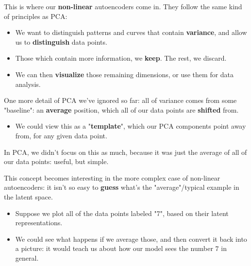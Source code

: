         This is where our \textbf{non-linear} autoencoders come in. They follow the same kind of principles as PCA: 
        
        \begin{itemize}
            \item We want to distinguish patterns and curves that contain \textbf{variance}, and allow us to \textbf{distinguish} data points.
            \item Those which contain more information, we \textbf{keep}. The rest, we discard.
            \item We can then \textbf{visualize} those remaining dimensions, or use them for data analysis.
        \end{itemize}

        \subsecdiv

        One more detail of PCA we've ignored so far: all of variance comes from some "baseline": an \textbf{average} position, which all of our data points are \textbf{shifted} from.

        \begin{itemize}
            \item We could view this as a "\textbf{template}", which our PCA components point away from, for any given data point.
        \end{itemize}

        In PCA, we didn't focus on this as much, because it was just the average of all of our data points: useful, but simple.

        This concept becomes interesting in the more complex case of non-linear autoencoders: it isn't so easy to \textbf{guess} what's the "average"/typical example in the latent space.
        
        \begin{itemize}
            \item \miniex Suppose we plot all of the data points labeled "7", based on their latent representations.
            \item We could see what happens if we average those, and then convert it back into a picture: it would teach us about how our model sees the number $7$ in general.
            
        \end{itemize}

        
\pagebreak

